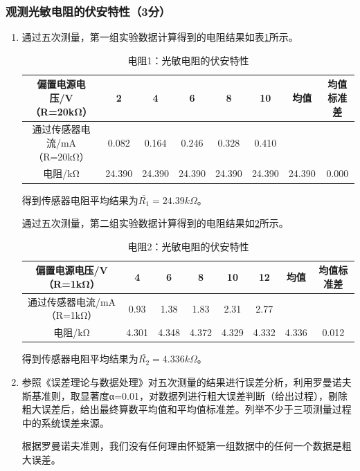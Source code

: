 \documentclass[dvipsnames, svgnames,a4paper,11pt]{article}
\begin{document}
	\subsubsection{观测光敏电阻的伏安特性（3分）}
	\begin{enumerate}
		\item 通过五次测量，第一组实验数据计算得到的电阻结果如表\cref{tab:tab7}所示。
		
		\begin{table}[h]
			\centering
			\caption{电阻1：光敏电阻的伏安特性}
			\label{tab:tab7}
			\begin{tabular}{|c|c|c|c|c|c|c|c|} 
				\hline 
				偏置电源电压/V（R=20kΩ） & 2 & 4 & 6 & 8 & 10 & 均值 & 均值标准差 \\ 
				\hline 
				通过传感器电流/mA（R=20kΩ） & 0.082 & 0.164 & 0.246 & 0.328 & 0.410 & & \\
				\hline 
				电阻/kΩ & 24.390 & 24.390 & 24.390 & 24.390 & 24.390 & 24.390 & 0.000 \\ 
				\hline 
			\end{tabular}
		\end{table}
				
		得到传感器电阻平均结果为$\bar{R_1}=24.39k\Omega$。
		
		通过五次测量，第二组实验数据计算得到的电阻结果如\cref{tab:tab8}所示。
		
		\begin{table}[h]
			\centering
			\caption{电阻2：光敏电阻的伏安特性}
			\label{tab:tab8}
			\begin{tabular}{|c|c|c|c|c|c|c|c|} 
				\hline 
				偏置电源电压/V（R=1kΩ） & 4 & 6 & 8 & 10 & 12 & 均值 & 均值标准差 \\ 
				\hline 
				通过传感器电流/mA（R=1kΩ） & 0.93 & 1.38 & 1.83 & 2.31 & 2.77 & & \\ 
				\hline 
				电阻/kΩ & 4.301 & 4.348 & 4.372 & 4.329 & 4.332 & 4.336 & 0.012 \\ 
				\hline 
			\end{tabular} 
		\end{table}
		
		得到传感器电阻平均结果为$\bar{R_2}=4.336k\Omega$。 	
		
		\item 参照《误差理论与数据处理》对五次测量的结果进行误差分析，利用罗曼诺夫斯基准则，取显著度α=0.01，对数据列进行粗大误差判断（给出过程），剔除粗大误差后，给出最终算数平均值和平均值标准差。列举不少于三项测量过程中的系统误差来源。
		
		根据罗曼诺夫准则，我们没有任何理由怀疑第一组数据中的任何一个数据是粗大误差。
		

\end{enumerate}
\end{document}
